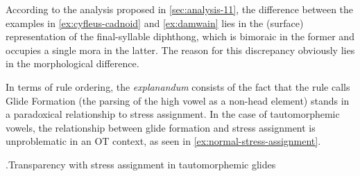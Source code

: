 According to the analysis proposed in \cref{sec:analysis-11}, the difference between the examples in \ref{ex:cyfleus-cadnoid} and \ref{ex:damwain} lies in the (surface) representation of the final\hyp syllable diphthong, which is bimoraic in the former and occupies a single mora in the latter. The reason for this discrepancy obviously lies in the morphological difference.

In terms of rule ordering, the \emph{explanandum} consists of the fact that the rule \citet{awbery86:_pembr_welsh} calls Glide Formation (\ie the parsing of the high vowel as a non-head element) stands in a paradoxical relationship to stress assignment. In the case of tautomorphemic vowels, the relationship between glide formation and stress assignment is unproblematic in an OT context, as seen in \ref{ex:normal-stress-assignment}.

\ex.\label{ex:normal-stress-assignment}Transparency with stress assignment in tautomorphemic glides\\
\begin{OTmultitableau}{3}
\OTmcandrow{[(ei)\smo[r\smo]a]}{,,*!}
\end{OTmultitableau}

